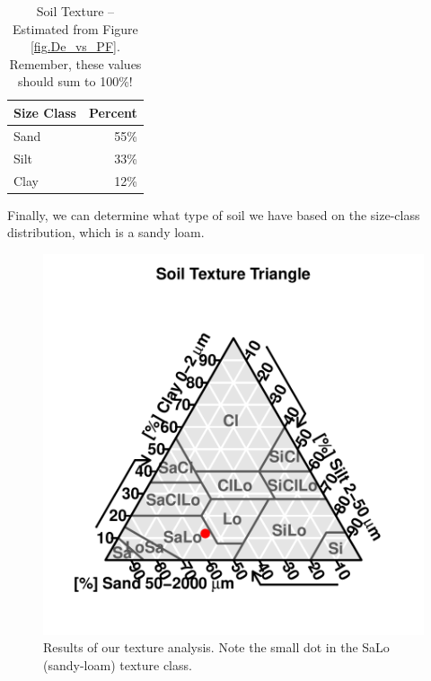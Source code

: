 \documentclass{tufte-handout}
\begin{document}
\begin{table}

		\begin{tabular}{lr}\hline
Size Class 	&		Percent		\\ \hline\hline
Sand				& 	55\% \\
Silt				&   33\% \\
Clay				& 	12\% \\ \hline		
		\end{tabular}
	\caption{Soil Texture -- Estimated from Figure \ref{fig.De_vs_PF}. Remember, these values should sum to 100\%!}
	\label{tab:SoilTexture}
\end{table}

Finally, we can determine what type of soil we have based on the size-class distribution, which is a sandy loam. 


\begin{figure}
\includegraphics{Soil_Texture_Analysis_160815-TTPlot}
\caption{Results of our texture analysis. Note the small dot in the SaLo (sandy-loam) texture class.}
\label{fig.simplifiedfig}
\end{figure}
\end{document}
